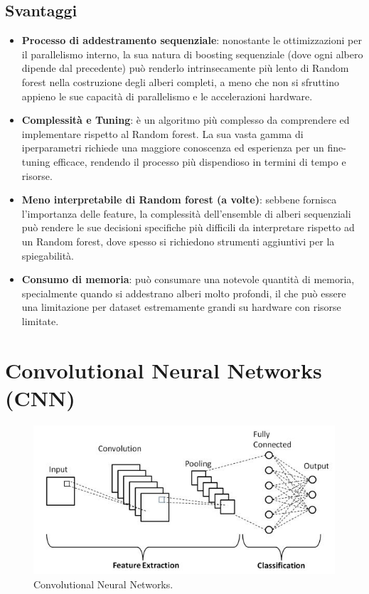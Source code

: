 \documentclass[a4paper,12pt]{report}
\begin{document}
	\section{Svantaggi}
	
	\begin{itemize}
		\item \textbf{Processo di addestramento sequenziale}: nonostante le ottimizzazioni per il parallelismo interno, la sua natura di boosting sequenziale (dove ogni albero dipende dal precedente) può renderlo intrinsecamente più lento di Random forest nella costruzione degli alberi completi, a meno che non si sfruttino appieno le sue capacità di parallelismo e le accelerazioni hardware.
		\item \textbf{Complessità e Tuning}: è un algoritmo più complesso da comprendere ed implementare rispetto al Random forest. La sua vasta gamma di iperparametri richiede una maggiore conoscenza ed esperienza per un fine-tuning efficace, rendendo il processo più dispendioso in termini di tempo e risorse.
		\item \textbf{Meno interpretabile di Random forest (a volte)}: sebbene fornisca l'importanza delle feature, la complessità dell'ensemble di alberi sequenziali può rendere le sue decisioni specifiche più difficili da interpretare rispetto ad un Random forest, dove spesso si richiedono strumenti aggiuntivi per la spiegabilità.
		\item \textbf{Consumo di memoria}: può consumare una notevole quantità di memoria, specialmente quando si addestrano alberi molto profondi, il che può essere una limitazione per dataset estremamente grandi su hardware con risorse limitate.
	\end{itemize}
	
	\chapter{Convolutional Neural Networks (CNN)}
	\begin{figure}[H]
		\centering
		\includegraphics[width=1.0\textwidth]{img/cnn.jpg}
		\caption{Convolutional Neural Networks.}
	\end{figure}
	
\end{document}
